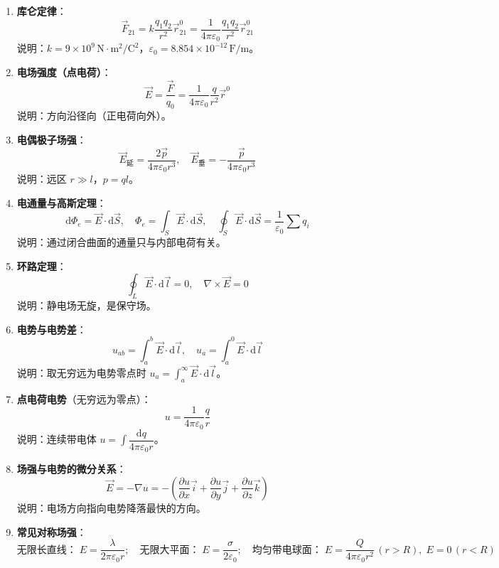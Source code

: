 \documentclass[12pt,a4paper]{ctexart}
\begin{document}
\begin{enumerate}[leftmargin=3em,label=\textbf{公式\arabic*}：,ref=公式\arabic*]

    \item \textbf{库仑定律}：
    \[
        \vec F_{21}=k\dfrac{q_1 q_2}{r^2}\vec r_{21}^0=\dfrac{1}{4\pi\varepsilon_0}\dfrac{q_1 q_2}{r^2}\vec r_{21}^0
    \]
    说明：$k=9\times10^9\,\text{N}\!\cdot\!\text{m}^2/\text{C}^2$，$\varepsilon_0=8.854\times10^{-12}\,\text{F/m}$。

    \item \textbf{电场强度（点电荷）}：
    \[
        \vec E=\dfrac{\vec F}{q_0}=\dfrac{1}{4\pi\varepsilon_0}\dfrac{q}{r^2}\vec r^0
    \]
    说明：方向沿径向（正电荷向外）。

    \item \textbf{电偶极子场强}：
    \[
        \vec E_{\text{延}}=\dfrac{2\vec p}{4\pi\varepsilon_0 r^3},\quad \vec E_{\text{垂}}=-\dfrac{\vec p}{4\pi\varepsilon_0 r^3}
    \]
    说明：远区 $r\gg l$，$p=ql$。

    \item \textbf{电通量与高斯定理}：
    \[
        \mathrm d\Phi_e=\vec E\cdot\mathrm d\vec S,\quad \Phi_e=\int_S\vec E\cdot\mathrm d\vec S,\quad \oint_S\vec E\cdot\mathrm d\vec S=\dfrac{1}{\varepsilon_0}\sum q_i
    \]
    说明：通过闭合曲面的通量只与内部电荷有关。

    \item \textbf{环路定理}：
    \[
        \oint_L \vec E\cdot\mathrm d\vec l=0,\quad \nabla\times\vec E=0
    \]
    说明：静电场无旋，是保守场。

    \item \textbf{电势与电势差}：
    \[
        u_{ab}=\int_a^b \vec E\cdot\mathrm d\vec l,\quad u_a=\int_a^0 \vec E\cdot\mathrm d\vec l
    \]
    说明：取无穷远为电势零点时 $u_a=\displaystyle\int_a^\infty \vec E\cdot\mathrm d\vec l$。

    \item \textbf{点电荷电势}（无穷远为零点）：
    \[
        u=\dfrac{1}{4\pi\varepsilon_0}\dfrac{q}{r}
    \]
    说明：连续带电体 $u=\displaystyle\int\dfrac{\mathrm dq}{4\pi\varepsilon_0 r}$。

    \item \textbf{场强与电势的微分关系}：
    \[
        \vec E=-\nabla u=-\left(\frac{\partial u}{\partial x}\vec i+\frac{\partial u}{\partial y}\vec j+\frac{\partial u}{\partial z}\vec k\right)
    \]
    说明：电场方向指向电势降落最快的方向。

    \item \textbf{常见对称场强}：
    \[
        \text{无限长直线：}\;E=\dfrac{\lambda}{2\pi\varepsilon_0 r};\quad \text{无限大平面：}\;E=\dfrac{\sigma}{2\varepsilon_0};\quad \text{均匀带电球面：}\;E=\dfrac{Q}{4\pi\varepsilon_0 r^2}\,(r>R),\;E=0\,(r<R)
    \]


\end{enumerate}
\end{document}
